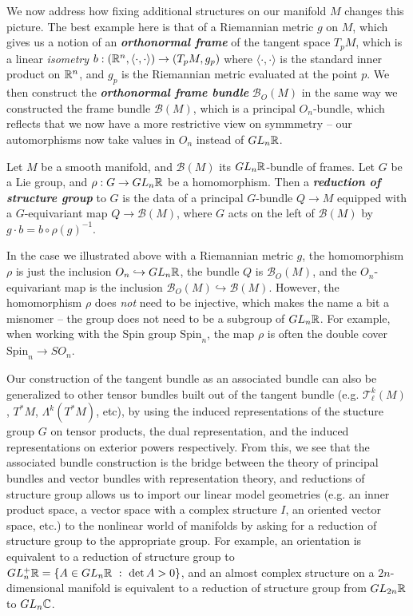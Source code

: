 \documentclass[abstract=on,twoside]{scrreprt}
\begin{document}
We now address how fixing additional structures on our manifold $M$ changes this
picture. The best example here is that of a Riemannian metric $g$ on $M$, which gives
us a notion of an \textbf{\textit{orthonormal frame}} of the tangent space $T_pM$,
which is a linear \emph{isometry} $b : (\mathbb{R}^n,\langle\cdot,\cdot\rangle) \to (T_pM,g_p)$
where $\langle\cdot,\cdot\rangle$ is the standard inner product on $\mathbb{R}^n$, and
$g_p$ is the Riemannian metric evaluated at the point $p$. We then construct the
\textbf{\textit{orthonormal frame bundle}} $\mathcal{B}_O(M)$ in the same way we
constructed the frame bundle $\mathcal{B}(M)$, which is a principal $O_n$-bundle,
which reflects that we now have a more restrictive view on symmmetry -- our
automorphisms now take values in $O_n$ instead of $GL_n\mathbb{R}$.
%
\begin{definition}
Let $M$ be a smooth manifold, and $\mathcal{B}(M)$ its $GL_n\mathbb{R}$-bundle of frames.
Let $G$ be a Lie group, and $\rho : G \to GL_n\mathbb{R}$ be a homomorphism. Then a
\textbf{\textit{reduction of structure group}} to $G$ is the data of a principal
$G$-bundle $Q \to M$ equipped with a $G$-equivariant map $Q \to \mathcal{B}(M)$, where
$G$ acts on the left of $\mathcal{B}(M)$ by $g \cdot b = b \circ \rho(g)^{-1}$.
\end{definition}
%
In the case we illustrated above with a Riemannian metric $g$, the homomorphism
$\rho$ is just the inclusion $O_n \hookrightarrow GL_n\mathbb{R}$, the bundle $Q$ is
$\mathcal{B}_O(M)$, and the $O_n$-equivariant map is the inclusion
$\mathcal{B}_O(M) \hookrightarrow \mathcal{B}(M)$. However, the homomorphism $\rho$
does \emph{not} need to be injective, which makes the name a bit a misnomer -- the
group does not need to be a subgroup of $GL_n\mathbb{R}$. For example, when working with
the Spin group $\mathrm{Spin}_n$, the map $\rho$ is often the double cover
$\mathrm{Spin}_n \to SO_n$.

Our construction of the tangent bundle as an associated bundle can also be generalized
to other tensor bundles built out of the tangent bundle (e.g. $\mathcal{T}^k_\ell(M)$,
$T^*M$, $\Lambda^k(T^*M)$, etc), by using the induced representations of the
stucture group $G$ on tensor products, the dual representation, and the induced
representations on exterior powers respectively. From this, we see that the associated
bundle construction is the bridge between the theory of principal bundles and vector
bundles with representation theory, and reductions of structure group allows us to
import our linear model geometries (e.g. an inner product space, a vector space with
a complex structure $I$, an oriented vector space, etc.) to the nonlinear world of
manifolds by asking for a reduction of structure group to the appropriate group. For
example, an orientation is equivalent to a reduction of structure group to
$GL_n^+\mathbb{R} = \{A \in GL_n\mathbb{R} ~:~ \det A > 0\}$, and an almost complex structure on a
$2n$-dimensional manifold is equivalent  to a reduction of structure group from
$GL_{2n}\mathbb{R}$ to $GL_n\mathbb{C}$.
%
\end{document}
